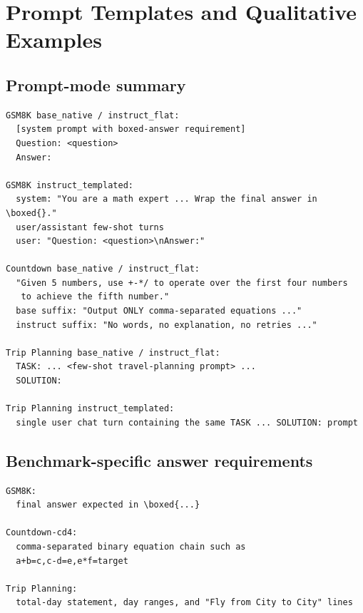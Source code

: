 \section{Prompt Templates and Qualitative Examples}

\subsection{Prompt-mode summary}
\begin{verbatim}
GSM8K base_native / instruct_flat:
  [system prompt with boxed-answer requirement]
  Question: <question>
  Answer:

GSM8K instruct_templated:
  system: "You are a math expert ... Wrap the final answer in \boxed{}."
  user/assistant few-shot turns
  user: "Question: <question>\nAnswer:"

Countdown base_native / instruct_flat:
  "Given 5 numbers, use +-*/ to operate over the first four numbers
   to achieve the fifth number."
  base suffix: "Output ONLY comma-separated equations ..."
  instruct suffix: "No words, no explanation, no retries ..."

Trip Planning base_native / instruct_flat:
  TASK: ... <few-shot travel-planning prompt> ...
  SOLUTION:

Trip Planning instruct_templated:
  single user chat turn containing the same TASK ... SOLUTION: prompt
\end{verbatim}

\subsection{Benchmark-specific answer requirements}
\begin{verbatim}
GSM8K:
  final answer expected in \boxed{...}

Countdown-cd4:
  comma-separated binary equation chain such as
  a+b=c,c-d=e,e*f=target

Trip Planning:
  total-day statement, day ranges, and "Fly from City to City" lines
\end{verbatim}


